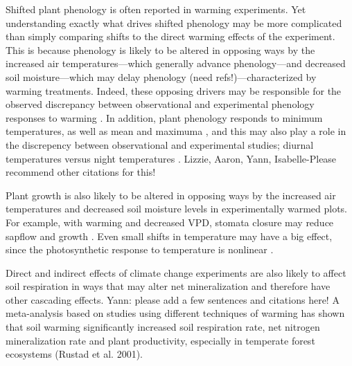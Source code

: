 \documentclass{article}
\begin{document}
\par Shifted plant phenology is often reported in warming experiments. Yet understanding exactly what drives shifted phenology may be more complicated than simply comparing shifts to the direct warming effects of the experiment. This is because phenology is likely to be altered in opposing ways by the increased air temperatures---which generally advance phenology---and decreased soil moisture---which may delay phenology (need refs!)---characterized by warming treatments. Indeed, these opposing drivers may be responsible for the observed discrepancy between observational and experimental phenology responses to warming \citep{wolkovich2012}. In addition, plant phenology responds to minimum temperatures, as well as mean and maximuma \citep{shen2016,fu2016,piao2015}, and this may also play a role in the discrepency between observational and experimental studies; diurnal temperatures versus night temperatures  \citep{shen2016,matthews2016}. Lizzie, Aaron, Yann, Isabelle-Please recommend other citations for this! %

\par Plant growth is also likely to be altered in opposing ways by the increased air temperatures and decreased soil moisture levels in experimentally warmed plots. For example, with warming and decreased VPD, stomata closure may reduce sapflow and growth \citep{templer2016}. Even small shifts in temperature may have a big effect, since the photosynthetic response to temperature is nonlinear \citep{berry1980}. %

\par Direct and indirect effects of climate change experiments are also likely to affect soil respiration in ways that may alter net mineralization and therefore have other cascading effects. Yann: please add a few sentences and citations here! \citep{jamieson2015,kharouba2015} A meta-analysis based on studies using different techniques of warming has shown that soil warming significantly increased soil respiration rate, net nitrogen mineralization rate and plant productivity, especially in temperate forest ecosystems (Rustad et al. 2001). %
\end{document}
